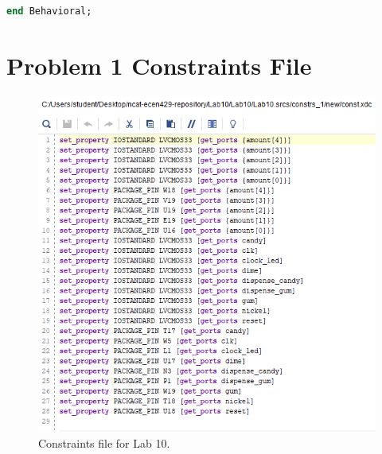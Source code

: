 \documentclass[11pt]{article}
\begin{document}
\begin{appendices}
\begin{lstlisting}[language=VHDL]
end Behavioral;
\end{lstlisting}

\section{Problem 1 Constraints File}
\begin{center}
\begin{figure}[H]
	\includegraphics[scale=1]{./images/const.png}
	\caption{\label{fig:Prob1Const}Constraints file for Lab 10.}
\end{figure}
\end{center}

\end{appendices}
\end{document}
